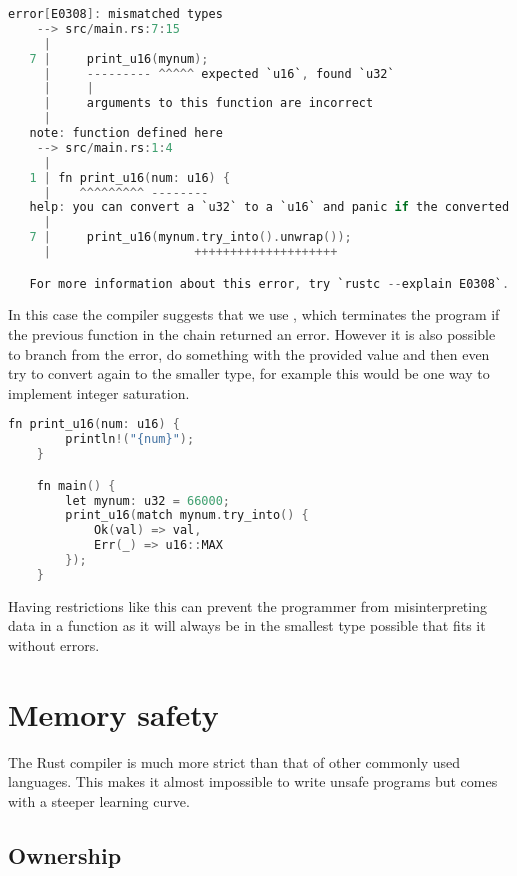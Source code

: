 \begin{lstlisting}[language=C,frame=single,float=!ht]
    error[E0308]: mismatched types
    --> src/main.rs:7:15
     |
   7 |     print_u16(mynum);
     |     --------- ^^^^^ expected `u16`, found `u32`
     |     |
     |     arguments to this function are incorrect
     |
   note: function defined here
    --> src/main.rs:1:4
     |
   1 | fn print_u16(num: u16) {
     |    ^^^^^^^^^ --------
   help: you can convert a `u32` to a `u16` and panic if the converted value doesn't fit
     |
   7 |     print_u16(mynum.try_into().unwrap());
     |                    ++++++++++++++++++++

   For more information about this error, try `rustc --explain E0308`.
\end{lstlisting}

In this case the compiler suggests that we use , which terminates the program if the previous function in the chain returned an error. However it is also possible to branch from the error, do something with the provided value and then even try to convert again to the smaller type, for example this would be one way to implement integer saturation.

\begin{lstlisting}[language=C,frame=single,float=!ht]
    fn print_u16(num: u16) {
        println!("{num}");
    }

    fn main() {
        let mynum: u32 = 66000;
        print_u16(match mynum.try_into() {
            Ok(val) => val,
            Err(_) => u16::MAX
        });
    }
\end{lstlisting}

Having restrictions like this can prevent the programmer from misinterpreting data in a function as it will always be in the smallest type possible that fits it without errors.

\section{Memory safety}

The Rust compiler is much more strict than that of other commonly used languages. This makes it almost impossible to write unsafe programs but comes with a steeper learning curve.

\subsection{Ownership}

